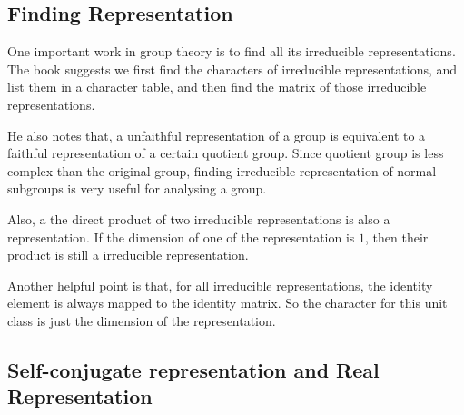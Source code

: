 \subsection{Finding Representation}
\label{sec:Finding-Representation}
One important work in group theory is to find all its irreducible
representations. The book \cite{book} suggests we first find the
characters of irreducible representations, and list them in a
character table, and then find the matrix of those irreducible
representations.

He also notes that, a unfaithful representation of a group is
equivalent to a faithful representation of a certain quotient group.
Since quotient group is less complex than the original group, finding
irreducible representation of normal subgroups is very useful for
analysing a group.

\begin{fact}
    Also, a the direct product of two irreducible representations is also
    a representation. If the dimension of one of the representation is
    $1$, then their product is still a irreducible representation.
\end{fact}
\begin{fact}
    \label{fact:character-of-identity}
    Another helpful point is that, for all irreducible
    representations, the identity element is always mapped to the
    identity matrix. So the character for this unit class is just the
    dimension of the representation.
\end{fact}
\subsection{Self-conjugate representation and Real Representation}
\label{sec:Self-conjugate-representation-and-Real-Representation}

